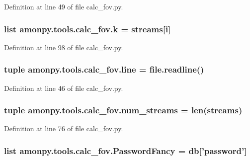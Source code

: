 Definition at line 49 of file calc\-\_\-fov.\-py.

\hypertarget{namespaceamonpy_1_1tools_1_1calc__fov_a4c3759f624220d1b1baf047a412a779b}{
\subsubsection[{k}]{\setlength{\rightskip}{0pt plus 5cm}list amonpy.\-tools.\-calc\-\_\-fov.\-k = {\bf streams}\mbox{[}i\mbox{]}}}\label{namespaceamonpy_1_1tools_1_1calc__fov_a4c3759f624220d1b1baf047a412a779b}


Definition at line 98 of file calc\-\_\-fov.\-py.

\hypertarget{namespaceamonpy_1_1tools_1_1calc__fov_abd58f153114f0c0bbde7d57f8fa6355b}{
\subsubsection[{line}]{\setlength{\rightskip}{0pt plus 5cm}tuple amonpy.\-tools.\-calc\-\_\-fov.\-line = file.\-readline()}}\label{namespaceamonpy_1_1tools_1_1calc__fov_abd58f153114f0c0bbde7d57f8fa6355b}


Definition at line 46 of file calc\-\_\-fov.\-py.

\hypertarget{namespaceamonpy_1_1tools_1_1calc__fov_ab98f07a49951b24807130f86a97aa904}{
\subsubsection[{num\-\_\-streams}]{\setlength{\rightskip}{0pt plus 5cm}tuple amonpy.\-tools.\-calc\-\_\-fov.\-num\-\_\-streams = len({\bf streams})}}\label{namespaceamonpy_1_1tools_1_1calc__fov_ab98f07a49951b24807130f86a97aa904}


Definition at line 76 of file calc\-\_\-fov.\-py.

\hypertarget{namespaceamonpy_1_1tools_1_1calc__fov_afc1cd72f7d87836af535f28839548514}{
\subsubsection[{Password\-Fancy}]{\setlength{\rightskip}{0pt plus 5cm}list amonpy.\-tools.\-calc\-\_\-fov.\-Password\-Fancy = {\bf db}\mbox{[}'password'\mbox{]}}}\label{namespaceamonpy_1_1tools_1_1calc__fov_afc1cd72f7d87836af535f28839548514}



